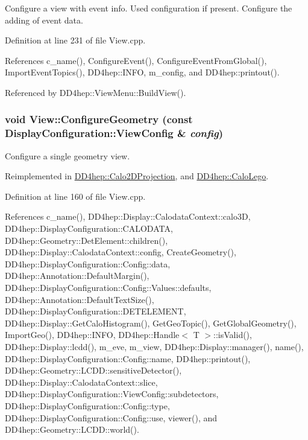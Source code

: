 Configure a view with event info. Used configuration if present. Configure the adding of event data. 

Definition at line 231 of file View.cpp.

References c\_\-name(), ConfigureEvent(), ConfigureEventFromGlobal(), ImportEventTopics(), DD4hep::INFO, m\_\-config, and DD4hep::printout().

Referenced by DD4hep::ViewMenu::BuildView().\hypertarget{class_d_d4hep_1_1_view_adefb4cb817819ec62803d34b89bf0988}{
\subsubsection[{ConfigureGeometry}]{\setlength{\rightskip}{0pt plus 5cm}void View::ConfigureGeometry (const {\bf DisplayConfiguration::ViewConfig} \& {\em config})}}
\label{class_d_d4hep_1_1_view_adefb4cb817819ec62803d34b89bf0988}


Configure a single geometry view. 

Reimplemented in \hyperlink{class_d_d4hep_1_1_calo2_d_projection_aabf1a03b64b1baad596aaa9349e3cbea}{DD4hep::Calo2DProjection}, and \hyperlink{class_d_d4hep_1_1_calo_lego_aca92ae6d2fe4e24a928fa23dbe755d19}{DD4hep::CaloLego}.

Definition at line 160 of file View.cpp.

References c\_\-name(), DD4hep::Display::CalodataContext::calo3D, DD4hep::DisplayConfiguration::CALODATA, DD4hep::Geometry::DetElement::children(), DD4hep::Display::CalodataContext::config, CreateGeometry(), DD4hep::DisplayConfiguration::Config::data, DD4hep::Annotation::DefaultMargin(), DD4hep::DisplayConfiguration::Config::Values::defaults, DD4hep::Annotation::DefaultTextSize(), DD4hep::DisplayConfiguration::DETELEMENT, DD4hep::Display::GetCaloHistogram(), GetGeoTopic(), GetGlobalGeometry(), ImportGeo(), DD4hep::INFO, DD4hep::Handle$<$ T $>$::isValid(), DD4hep::Display::lcdd(), m\_\-eve, m\_\-view, DD4hep::Display::manager(), name(), DD4hep::DisplayConfiguration::Config::name, DD4hep::printout(), DD4hep::Geometry::LCDD::sensitiveDetector(), DD4hep::Display::CalodataContext::slice, DD4hep::DisplayConfiguration::ViewConfig::subdetectors, DD4hep::DisplayConfiguration::Config::type, DD4hep::DisplayConfiguration::Config::use, viewer(), and DD4hep::Geometry::LCDD::world().


